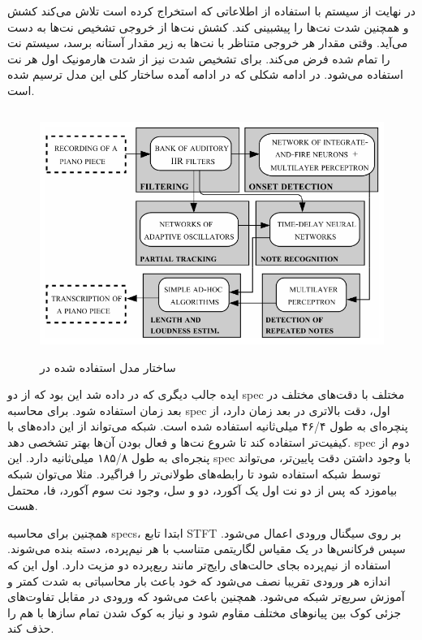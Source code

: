 در نهایت از سیستم با استفاده از اطلاعاتی که استخراج کرده است تلاش می‌کند کشش و
همچنین شدت نت‌ها را پیشبینی کند. کشش نت‌ها از خروجی تشخیص نت‌ها به دست می‌آید.
وقتی مقدار هر خروجی متناظر با نت‌ها به زیر مقدار آستانه برسد، سیستم نت را تمام
شده فرض می‌کند. برای تشخیص شدت نیز از شدت هارمونیک اول هر نت استفاده می‌شود. در
ادامه شکلی که در ادامه آمده ساختار کلی این مدل ترسیم شده است.
\begin{figure}[ht]
    \centering
    \includegraphics[height=8cm]{./statics/marolt2004connectionist_architecture.png}
    \caption{ساختار مدل استفاده شده در \cite{marolt2004connectionist}}
\end{figure}

ایده جالب دیگری که در \cite{bock2012polyphonic} داده شد این بود که از دو
\gls{spec} مختلف با دقت‌های مختلف در بعد زمان استفاده شود. برای محاسبه
\gls{spec} اول، دقت بالاتری در بعد زمان دارد، از پنچره‌ای به طول ۴۶/۴ میلی‌ثانیه
استفاده شده است. شبکه می‌تواند از این داده‌های با کیفیت‌تر استفاده کند تا شروع
نت‌ها و فعال بودن آن‌ها بهتر تشخصی دهد. \gls{spec} دوم از پنجره‌ای به طول ۱۸۵/۸
میلی‌ثانیه دارد. این \gls{spec} با وجود داشتن دقت پایین‌تر، می‌تواند توسط شبکه
استفاده شود تا رابطه‌های طولانی‌تر را فراگیرد. مثلا می‌توان شبکه بیاموزد که پس
از دو نت اول یک آکورد، دو و سل، وجود نت سوم آکورد، فا، محتمل هست.

همچنین برای محاسبه \glspl{spec}، ابتدا تابع \gls{STFT} بر روی سیگنال ورودی اعمال
می‌شود. سپس فرکانس‌ها در یک مقیاس لگاریتمی متناسب با هر نیم‌پرده، دسته بنده
می‌شوند. استفاده از نیم‌پرده بجای حالت‌های رایج‌تر مانند ربع‌پرده دو مزیت دارد.
اول این که اندازه هر ورودی تقریبا نصف می‌شود که خود باعث بار محاسباتی به شدت
کمتر و آموزش سریع‌تر شبکه می‌شود. همچنین باعث می‌شود که ورودی در مقابل تفاوت‌های
جزئی کوک بین پیانو‌های مختلف مقاوم شود و نیاز به کوک شدن تمام سازها با هم را حذف
کند.

